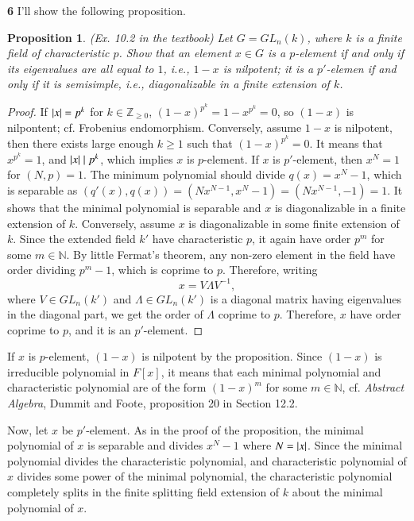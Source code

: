 \documentclass[a4paper, 12pt]{article}
\theoremstyle{Mydefinition}
\theoremstyle{Mytheorem}
\newtheorem{proposition}[statement]{Proposition}
\begin{document}
\noindent \textbf{6}
I'll show the following proposition.
\begin{proposition}
(Ex. 10.2 in the textbook) Let $G=GL_n(k)$, where $k$ is a finite field of characteristic $p$. Show that an element $x\in G$ is a $p$-element if and only if its eigenvalues are all equal to $1$, i.e., $1-x$ is nilpotent; it is a $p'$-elemen if and only if it is semisimple, i.e., diagonalizable in a finite extension of $k$.
\end{proposition}
\begin{proof}
If $\abs{x} = p^k$ for $k\in\mathbb{Z}_{\geq 0}$, $(1-x)^{p^k} = 1-x^{p^k} = 0$, so $(1-x)$ is nilpontent; cf. Frobenius endomorphism. Conversely, assume $1-x$ is nilpotent, then there exists large enough $k\geq 1$ such that $(1-x)^{p^k} = 0$. It means that $x^{p^k} = 1$, and $\abs{x}\mid p^k$, which implies $x$ is $p$-element.
If $x$ is $p'$-element, then $x^N = 1$ for $(N, p)=1$. The minimum polynomial should divide $q(x) = x^N-1$, which is separable as $(q'(x), q(x)) = (Nx^{N-1}, x^N-1) = (Nx^{N-1}, -1) = 1$. It shows that the minimal polynomial is separable and $x$ is diagonalizable in a finite extension of $k$. Conversely, assume $x$ is diagonalizable in some finite extension of $k$. Since the extended field $k'$ have characteristic $p$, it again have order $p^m$ for some $m\in\mathbb{N}$. By little Fermat's theorem, any non-zero element in the field have order dividing $p^m-1$, which is coprime to $p$. Therefore, writing
\begin{equation}
    x = V\Lambda V^{-1},
\end{equation}
where $V\in GL_n(k')$ and $\Lambda\in GL_n(k')$ is a diagonal matrix having eigenvalues in the diagonal part, we get the order of $\Lambda$ coprime to $p$. Therefore, $x$ have order coprime to $p$, and it is an $p'$-element.
\end{proof}

If $x$ is $p$-element, $(1-x)$ is nilpotent by the proposition. Since $(1-x)$ is irreducible polynomial in $F[x]$, it means that each minimal polynomial and characteristic polynomial are of the form $(1-x)^m$ for some $m\in\mathbb{N}$, cf. \textit{Abstract Algebra}, Dummit and Foote, proposition 20 in Section 12.2.

Now, let $x$ be $p'$-element. As in the proof of the proposition, the minimal polynomial of $x$ is separable and divides $x^N-1$ where $N=\abs{x}$. Since the minimal polynomial divides the characteristic polynomial, and characteristic polynomial of $x$ divides some power of the minimal polynomial, the characteristic polynomial completely splits in the finite splitting field extension of $k$ about the minimal polynomial of $x$.
\end{document}
